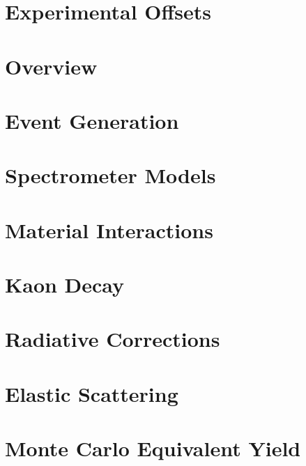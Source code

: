 \documentclass[
]{report}
\begin{document}
\hypertarget{Section-6.5}{%
\section{Experimental Offsets}\label{Section-6.5}}

\label{Chapter-7}

\hypertarget{Section-7.1}{%
\section{Overview}\label{Section-7.1}}

\hypertarget{Section-7.2}{%
\section{Event Generation}\label{Section-7.2}}

\hypertarget{Section-7.3}{%
\section{Spectrometer Models}\label{Section-7.3}}

\hypertarget{Section-7.4}{%
\section{Material Interactions}\label{Section-7.4}}

\hypertarget{Section-7.5}{%
\section{Kaon Decay}\label{Section-7.5}}

\hypertarget{Section-7.6}{%
\section{Radiative Corrections}\label{Section-7.6}}

\hypertarget{Section-7.7}{%
\section{Elastic Scattering}\label{Section-7.7}}

\label{Chapter-8}

\hypertarget{Section-8.1}{%
\section{Monte Carlo Equivalent Yield}\label{Section-8.1}}
\end{document}
